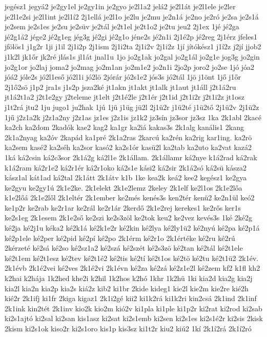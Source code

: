 {jegész1
jegyá2
je2gy1el
je2gy1in
je2gyo
je2l1a2
jelá2
je2l1át
je2l1ele
je2ler
je2l1e2si
je2l1int
je2l1í2
2j1ellá
je2l1o
je2lu
je2mu
je2n1á
je2no
je2ró
je2sa
je2s1á
je2sem
je2s1es
je2su
je2süv
je2tál
je2t1el
je2t1o2
je2tu
jeu2
2j1ex
1jé
jé2ga
jé2g1á2
jége2
jé2g1eg
jég3g
jé2gi
jé2g1o
jéne2s
jé2n1i
2j1é2p
jé2reg
2j1érz
jfeles1
jfölös1
j1g2r
1ji
j1il
2j1i2p
2j1ism
2j1i2ta
2j1i2v
2j1i2z
1jí
jítókész1
j1í2z
j2jí
jjob2
j1k2l
jk1őr
jk2ré
jlás1s
jl1át
jnal1u
1jo
jo2g1ak
jo2gal
jo2g1ál
jo2g1e
jog3g
jo2gin
jo2g1or
jo2laj
joma2
jo2mag
jo2m1an
jo2m1e2
jo2n1i
2jo2p
joro2
jo2se
1jó
jóa2
jóá2
jóle2s
jó2l1eső
jó2l1i
jó2lö
2jórár
jó2s1e2
jós3s
jó2tál
1jö
j1önt
1jő
j1őr
2j1ő2sö
j1p2
jra1s
j1s2p
jsza2ké
jt1akn
jt1akt
jt1alk
jt1aut
jt1áll
j2t1á2ru
jt1á2t1a2
j2t1e2gy
j2teleme
jt1elt
j2t1é2le
j2t1ér
j2t1id
j2t1i2r
j2t1i2z
jt1osz
j1t2rá
jtu2
1ju
jugo1
ju2hak
1jú
1jü
j1üg
jü2l
2j1ü2r
j1ü2té
j1ü2tő
2j1ü2v
2j1ü2z
1jű
j2z1a2k
j2z1a2ny
j2z1as
jz1es
j2z1is
jz1k2
jz3sín
jz3sor
jz3sz
1ka
2k1abl
2kacé
ka2ch
ka2dom
2kadók
kae2
kag2
ka1gr
ka2iá
kakas3s
2k1alg
kanális1
2kang
2k1a2nyag
ka2óv
2kapád
ka1pré
2k1a2ras
2karcú
ka2rén
ka2rig
kar1ing.
ka2rö
ka2sem
kasé2
ka2séh
ka2sor
kasó2
ka2s1ór
kasü2l
ka2tab
ka2uto
ka2vat
kazá2
1ká
ká2csin
ká2c3sor
2k1á2g
ká2l1e
2k1állam.
2k1államr
ká2nye
k1á2rad
ká2rak
k1á2ram
ká2r1e2
ká2r1ér
ká2r1oko
ká2s1e
kási2
ká2sir
2k1á2só
ká2sü
kásza2
kász1al
kát1ad
ká2tal
2k1átt
2k1átv
k1b
1ke
kea2k
keá2
kee2
kegész1
ke2gya
ke2gyu
ke2gy1ú
2k1e2ke.
2k1elekt
2k1e2lemz
2keley
2k1elf
ke2l1os
2k1e2lőa
k1e2lőá
2k1e2lől
2k1eltér
2k1ember
ke2més
kenés3s
ken2tér
kenü2
ke2n1ül
keó2
ke1p2r
ke2rab
ke2r1ar
ke2rál
ke2r1ár
2kerdő
2k1e2rej
kerekes1
ke2rős
ker1s
ke2s1eg
2k1esem
2k1e2ső
ke2szi
ke2s3zöl
ke2tok
keu2
ke2vez
kevés3s
1ké
2ké2g
ké2ja
ké2j1u
kéka2
ké2k1á
ké2k1e2r
ké2kin
ké2lya
ké2ly1ü2
ké2nyú
ké2pa
ké2p1á
ké2p1ele
ké2per
ké2pid
ké2pí
ké2po
2k1érm
ké2r1o
2k1értéke
ké2ru
ké2rú
2kérzeté
ké2sá
ké2so
ké2sz1a2
ké2szá
ké2szét
ké2s3zö
ké2tan
ké2tál
ké2t1ele
ké2t1em
ké2t1esz
ké2tev
ké2t1é2
ké2tis
ké2tí
ké2t1os
ké2tö
ké2tu
ké2t1ü2
2k1év.
2k1évb
2k1é2vei
ké2ves
2k1é2vi
2k1évn
ké2za
ké2zá
ké2z1e2l
ké2zem
kf2
k1fl
kh2
k2hai
k2hája
1k2hed
khe2i
k2hil
1k2hos
k2hó
1khr
1k2hü
1ki
kia2d
kia2g
kia2j
kia2l
kia2n
kia2p
kia2s
kiá2z
kib2
ki1br
2kide
kideg1
kie2l
kie2m
kie2re
kié2h
kié2r
2k1ifj
ki1fr
2kiga
kigaz1
2k1i2gé
kii2
ki1k2rá
ki1k2ri
kin2csá
2k1ind
2k1inf
2k1ink
kin2tét
2k1inv
kio2k
kio2m
kió2v
ki1pla
ki1ple
ki1p2r
ki2rat
ki2rod
ki2sab
ki2s1ajtó
ki2sal
ki2san
kis1asz
ki2sat
ki2s1emb
ki2sen
ki2s1es
ki2s1é2r
ki2sis
2kisk
2kism
ki2s1ok
kiso2r
ki2s1oro
kis1p
kis3sz
ki1t2r
kiu2
kiú2
1kí
2k1í2rá
2k1í2ró
}
